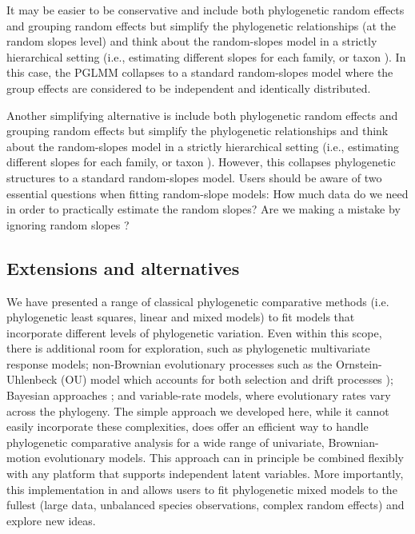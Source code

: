 \documentclass[12pt]{article}
\begin{document}
It may be easier to be conservative and include both phylogenetic random effects and grouping random effects
but simplify the phylogenetic relationships (at the random slopes level) and think about the random-slopes model in a strictly hierarchical setting (i.e., estimating different slopes for each family, or taxon \citep{bunnefeld2012island}). In this case, the PGLMM collapses to a standard random-slopes model where the group effects are considered to be independent and identically distributed.

Another simplifying alternative is include both phylogenetic random effects and grouping random effects but simplify the phylogenetic relationships and think about the random-slopes model in a strictly hierarchical setting (i.e., estimating different slopes for each family, or taxon \citep{bunnefeld2012island}). 
However, this collapses phylogenetic structures to a standard random-slopes model. 
Users should be aware of two essential questions when fitting random-slope models: How much data do we need in order to practically estimate the random slopes? Are we making a mistake by ignoring random slopes \citep{schielzeth2008conclusions}? 

\subsection*{Extensions and alternatives}

We have presented a range of classical phylogenetic comparative methods (i.e. phylogenetic least squares, linear and mixed models) to fit models that incorporate different levels of phylogenetic variation.
Even within this scope, there is additional room for exploration, such as phylogenetic multivariate response models; non-Brownian evolutionary processes such as the Ornstein-Uhlenbeck (OU) model which accounts for both selection and drift processes \citep{butler2004phylogenetic}); Bayesian approaches \citep{hadfield2010general}; and variable-rate models, where evolutionary rates vary across the phylogeny.
The simple approach we developed here, while it cannot easily incorporate these complexities, does offer an efficient way to handle phylogenetic comparative analysis for a wide range of univariate, Brownian-motion evolutionary models. 
This approach can in principle be combined flexibly with any platform that supports independent latent variables.
More importantly, this implementation in  and  allows users to fit phylogenetic mixed models to the fullest (large data, unbalanced species observations, complex random effects) and explore new ideas.
\end{document}
